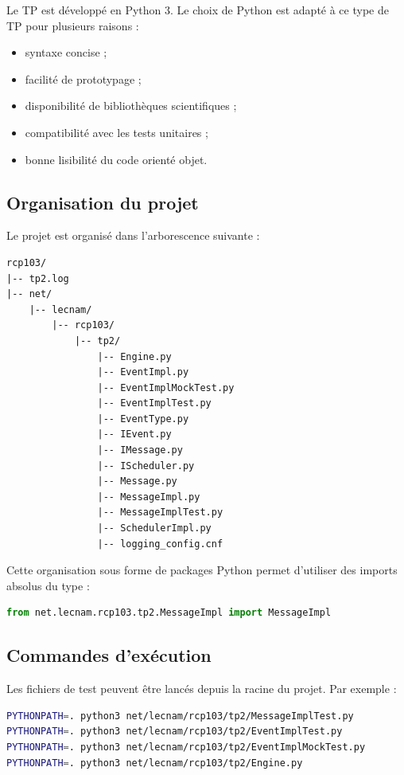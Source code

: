 \documentclass{article}
\begin{document}
Le TP est développé en Python 3. Le choix de Python est adapté à ce type de TP pour plusieurs raisons :
\begin{itemize}[leftmargin=*]
    \item syntaxe concise ;
    \item facilité de prototypage ;
    \item disponibilité de bibliothèques scientifiques ;
    \item compatibilité avec les tests unitaires ;
    \item bonne lisibilité du code orienté objet.
\end{itemize}

\subsection{Organisation du projet}

Le projet est organisé dans l’arborescence suivante :

\begin{verbatim}
rcp103/
|-- tp2.log
|-- net/
    |-- lecnam/
        |-- rcp103/
            |-- tp2/
                |-- Engine.py
                |-- EventImpl.py
                |-- EventImplMockTest.py
                |-- EventImplTest.py
                |-- EventType.py
                |-- IEvent.py
                |-- IMessage.py
                |-- IScheduler.py
                |-- Message.py
                |-- MessageImpl.py
                |-- MessageImplTest.py
                |-- SchedulerImpl.py
                |-- logging_config.cnf
\end{verbatim}

Cette organisation sous forme de packages Python permet d’utiliser des imports absolus du type :

\begin{lstlisting}[language=Python, caption=Exemple d'import absolu]
from net.lecnam.rcp103.tp2.MessageImpl import MessageImpl
\end{lstlisting}

\subsection{Commandes d’exécution}

Les fichiers de test peuvent être lancés depuis la racine du projet. Par exemple :

\begin{lstlisting}[language=bash, caption=Exécution des tests sous Linux/WSL]
PYTHONPATH=. python3 net/lecnam/rcp103/tp2/MessageImplTest.py
PYTHONPATH=. python3 net/lecnam/rcp103/tp2/EventImplTest.py
PYTHONPATH=. python3 net/lecnam/rcp103/tp2/EventImplMockTest.py
PYTHONPATH=. python3 net/lecnam/rcp103/tp2/Engine.py
\end{lstlisting}
\end{document}
